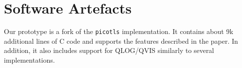 %


\section*{Software Artefacts}

Our \tcpls prototype is a fork of the \texttt{picotls}  implementation. 
It contains about 9k additional lines of C code and supports the features 
described in the paper. In addition, it also includes support for QLOG/QVIS 
\cite{marx2020debugging} similarly to several \quic implementations. 
\newpage



